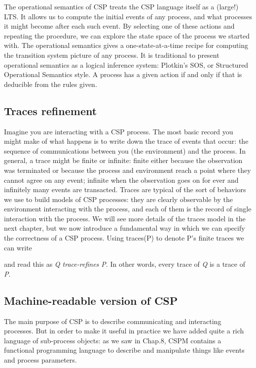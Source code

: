 The operational semantics of CSP treats the CSP language itself as a (large!) LTS. It allows us to compute the initial events of any  process, and what processes it might become after each such event. By selecting one of these actions and repeating the procedure, we can explore the state space of the process we started with. The operational semantics gives a one-state-at-a-time recipe for computing the transition system picture of any process. It is traditional to present operational semantics as a logical inference system: Plotkin’s SOS, or Structured Operational Semantics style. A process has a given action if and only if that is deducible from the rules given.

\subsection{Traces refinement}

Imagine you are interacting with a CSP process. The most basic record you might make of what happens is to write down the trace of events that occur: the sequence of communications between you (the environment) and the process. In general, a trace might be finite or infinite: finite either because the observation was terminated or because the process and environment reach a point where they cannot agree on any event; infinite when the observation goes on for ever and infinitely many events are transacted. Traces are typical of the sort of behaviors we use to build models of CSP processes: they are clearly observable by the environment interacting with the process, and each of them is the record of single interaction with the process. We will see more details of the traces model in the next chapter, but we now introduce a fundamental way in which we can specify the correctness of a CSP process. Using traces(P) to denote P’s finite traces we can write

and read this as \emph{Q trace-refines P}. In other words, every trace of \emph{Q} is a trace of \emph{P}.

\subsection{Machine-readable version of CSP}

The main purpose of CSP is to describe communicating and interacting processes. But in order to make it useful in practice we have added quite a rich language of sub-process objects: as we saw in Chap.8, CSPM contains a functional programming language to describe and manipulate things like events and process parameters.

